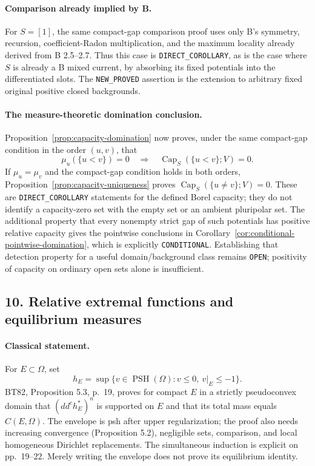 \documentclass[11pt,a4paper]{article}
\numberwithin{equation}{section}
\theoremstyle{definition}
\theoremstyle{remark}
\begin{document}
\paragraph{Comparison already implied by B.}
For \(S=[1]\), the same compact-gap comparison proof uses only B's
symmetry, recursion, coefficient-Radon multiplication, and the maximum
locality already derived from B 2.5--2.7. Thus this case is
\texttt{DIRECT\_COROLLARY}, as is the case where \(S\) is already a B
mixed current, by absorbing its fixed potentials into the differentiated
slots. The \texttt{NEW\_PROVED} assertion is the extension to arbitrary
fixed original positive closed backgrounds.

\paragraph{The measure-theoretic domination conclusion.}
Proposition~\ref{prop:capacity-domination} now proves, under the same
compact-gap condition in the order \((u,v)\), that
\[
 \mu_u(\{u<v\})=0
 \quad\Longrightarrow\quad
 \operatorname{Cap}_S(\{u<v\};V)=0.
\]
If \(\mu_u=\mu_v\) and the compact-gap condition holds in both
orders, Proposition~\ref{prop:capacity-uniqueness} proves
\(\operatorname{Cap}_S(\{u\ne v\};V)=0\). These are
\texttt{DIRECT\_COROLLARY} statements for the defined Borel capacity;
they do not identify a capacity-zero set with the empty set or an ambient
pluripolar set. The additional property that every nonempty strict gap
of such potentials has positive relative capacity gives the pointwise
conclusions in Corollary~\ref{cor:conditional-pointwise-domination},
which is explicitly \texttt{CONDITIONAL}. Establishing that detection
property for a useful domain/background class remains \texttt{OPEN};
positivity of capacity on ordinary open sets alone is insufficient.

\subsection{10. Relative extremal functions and equilibrium measures}

\paragraph{Classical statement.}
For \(E\subset\Omega\), set
\[
 h_E=\sup\{v\in\operatorname{PSH}(\Omega):v\leq0,\ v|_E\leq-1\}.
\]
BT82, Proposition 5.3, p.~19, proves for compact \(E\) in a
strictly pseudoconvex domain that \((dd^ch_E^*)^n\) is supported on
\(E\) and that its total mass equals \(C(E,\Omega)\). The envelope
is psh after upper regularization; the proof also needs increasing
convergence (Proposition 5.2), negligible sets, comparison, and local
homogeneous Dirichlet replacements. The simultaneous induction is
explicit on pp.~19--22. Merely writing the envelope does not prove its
equilibrium identity.\cite[\S5, especially Proposition 5.3]{BT82}
\end{document}
